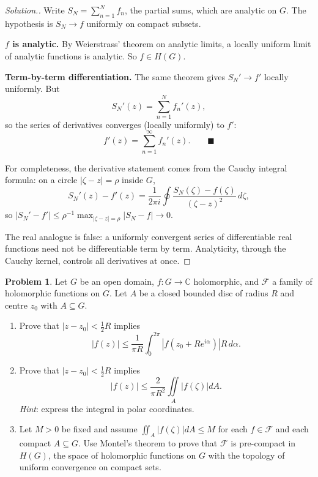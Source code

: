 \documentclass[11pt,a4paper]{article}
\theoremstyle{definition}
\newtheorem{problemx}{Problem}[section]
\newenvironment{problem}{\begin{problemx}}{\end{problemx}}
\newenvironment{solution}
  {\renewcommand{\qedsymbol}{}\begin{proof}[\textit{Solution}.]}
  {\end{proof}}
\begin{document}
\begin{solution}
Write $S_N = \sum^{N}_{n=1} f_n$, the partial sums, which are analytic on $G$. The
hypothesis is $S_N \rightarrow f$ uniformly on compact subsets.

\textbf{$f$ is analytic.} By Weierstrass' theorem on analytic limits, a locally
uniform limit of analytic functions is analytic. So $f \in H(G)$.

\textbf{Term-by-term differentiation.} The same theorem gives
$S_N' \rightarrow f'$ locally uniformly. But
$$S_N'(z) = \sum^{N}_{n=1} f_n'(z),$$
so the series of derivatives converges (locally uniformly) to $f'$:
$$\boxed{f'(z) = \sum^{\infty}_{n=1} f_n'(z).} \qquad \blacksquare$$

For completeness, the derivative statement comes from the Cauchy integral formula:
on a circle $\left|\zeta - z\right| = \rho$ inside $G$,
$$S_N'(z) - f'(z) = \frac{1}{2\pi i}\oint
\frac{S_N(\zeta)-f(\zeta)}{(\zeta-z)^{2}}\,d\zeta,$$
so $\left|S_N' - f'\right| \leq \rho^{-1}\max_{\left|\zeta-z\right|=\rho}
\left|S_N-f\right| \rightarrow 0$.

The real analogue is false: a uniformly convergent series of differentiable real
functions need not be differentiable term by term. Analyticity, through the Cauchy
kernel, controls all derivatives at once.
\end{solution}


\begin{problem}
Let $G$ be an open domain, $f : G \rightarrow \mathbb{C}$ holomorphic, and
$\mathcal{F}$ a family of holomorphic functions on $G$. Let $A$ be a closed
bounded disc of radius $R$ and centre $z_0$ with $A \subseteq G$.
\begin{enumerate}
\item[(a).] Prove that $\left|z - z_0\right| < \tfrac{1}{2}R$ implies
$$\left|f(z)\right| \leq \frac{1}{\pi R}
\int^{2\pi}_{0}\left|f\!\left(z_0 + Re^{i\alpha}\right)\right| R\,d\alpha .$$
\item[(b).] Prove that $\left|z - z_0\right| < \tfrac{1}{2}R$ implies
$$\left|f(z)\right| \leq \frac{2}{\pi R^{2}}
\iint\limits_{A}\left|f(\zeta)\right|dA .$$
\textit{Hint}: express the integral in polar coordinates.
\item[(c).] Let $M > 0$ be fixed and assume
$\iint_{A}\left|f(\zeta)\right|dA \leq M$ for each $f \in \mathcal{F}$ and each
compact $A \subseteq G$. Use Montel's theorem to prove that $\mathcal{F}$ is
pre-compact in $H(G)$, the space of holomorphic functions on $G$ with the
topology of uniform convergence on compact sets.
\end{enumerate}
\end{problem}
\end{document}
